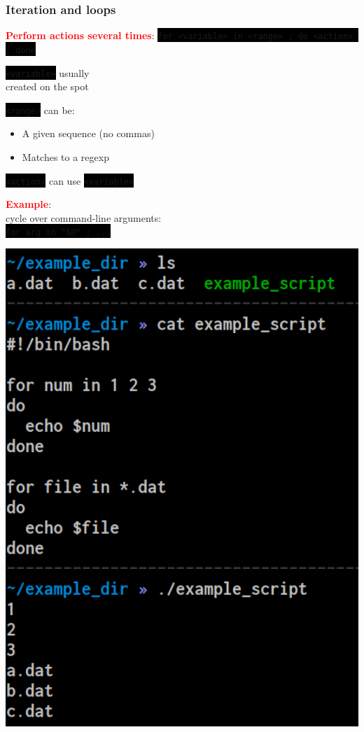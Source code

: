\documentclass[unknownkeysallowed, 10pt, a4 paper, handout]{beamer}
\newcommand{\focus}[1]{\textbf{\textcolor{red}{#1}}}
\newcommand{\code}[1]{\colorbox{black}{\color{green}\texttt{#1}}}
\newcommand{\sidebyside}[5]{
  \begin{minipage}{#1\textwidth}
    #2
  \end{minipage} #3 \begin{minipage}{#4\textwidth}
    #5
  \end{minipage}
}
\begin{document}
\begin{frame}
  \begin{center}
    \frametitle{Iteration and loops}

    \focus{Perform actions several times}:
    \code{for <variable> in <range> ; do <action> ; done}

    \sidebyside{0.50}{
      \centering
      \code{<variable>} usually\\
      created on the spot

      \vspace{5mm}

      \code{<range>} can be:
      \begin{itemize}
        \item A given sequence (no commas)\\
        \item Matches to a regexp
      \end{itemize}

      \vspace{5mm}

      \code{<action>} can use \code{<variable>}

      \vspace{5mm}

      \focus{Example}:\\
      cycle over command-line arguments:\\
      \code{for arg in "\$@" ; ...}
    }{\hfill}{0.45}{
      \begin{center}
        \includegraphics[width=1.00\textwidth]{pics/for.png}
      \end{center}
    }
  \end{center}
\end{frame}
\end{document}
